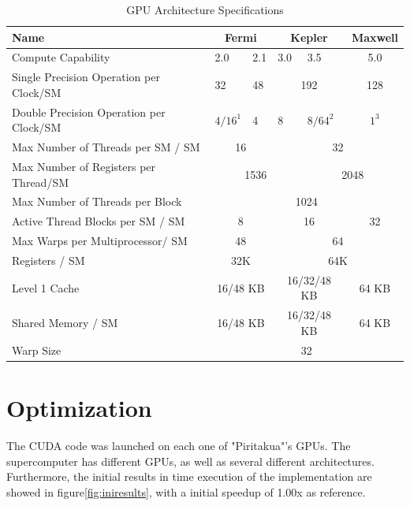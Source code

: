 \begin{table}[h]
\centering
  \begin{tabular} { | l | l  | l | l | l  |  l  | l |}
    \hline
    Name & \multicolumn{2}{|c|}{Fermi} & \multicolumn{2}{|c|}{Kepler} &  \multicolumn{2}{|c|}{Maxwell} \\
    \hline
    Compute Capability & 2.0 & 2.1 & 3.0 & 3.5 & \multicolumn{2}{|c|}{5.0}\\
   \hline
    Single Precision Operation per Clock/SM & 32 & 48 & \multicolumn{2}{|c|}{192} & \multicolumn{2}{|c|}{128}\\
   \hline
    Double Precision Operation per Clock/SM & $4/16^1$ & 4 & 8 & $8/64^2$ & \multicolumn{2}{|c|}{$1^3$}\\
   \hline
    Max Number of Threads per SM / SM & \multicolumn{2}{|c|}{16} & \multicolumn{4}{|c|}{32}\\
   \hline
    Max Number of Registers per Thread/SM & \multicolumn{3}{|c|}{1536} & \multicolumn{3}{|c|}{2048}\\
   \hline
       Max Number of Threads per Block & \multicolumn{6}{|c|}{1024}\\
   \hline
   Active Thread Blocks per SM / SM & \multicolumn{2}{|c|}{8} & \multicolumn{2}{|c|}{16} & \multicolumn{2}{|c|}{32}\\
   \hline
   Max Warps per Multiprocessor/ SM & \multicolumn{2}{|c|}{48} & \multicolumn{4}{|c|}{64}\\
   \hline
   Registers / SM & \multicolumn{2}{|c|}{32K} & \multicolumn{4}{|c|}{64K}\\
   \hline
   Level 1 Cache & \multicolumn{2}{|c|}{16/48 KB} & \multicolumn{2}{|c|}{16/32/48 KB} & \multicolumn{2}{|c|}{64 KB}\\
   \hline
   Shared Memory / SM & \multicolumn{2}{|c|}{16/48 KB} & \multicolumn{2}{|c|}{16/32/48 KB} & \multicolumn{2}{|c|}{64 KB}\\
   \hline
   Warp Size & \multicolumn{6}{c|}{32}  \\
   \hline
  \end{tabular}
  \caption{GPU Architecture Specifications}
  \label{tab:arch}
  \end{table}
 
\section{Optimization}

The CUDA code was launched on each one of "Piritakua"'s GPUs. The supercomputer has different GPUs, as well as several different  architectures. Furthermore, the initial results in time execution of the implementation are showed in figure\ref{fig:iniresults}, with a initial speedup of 1.00x as reference.

